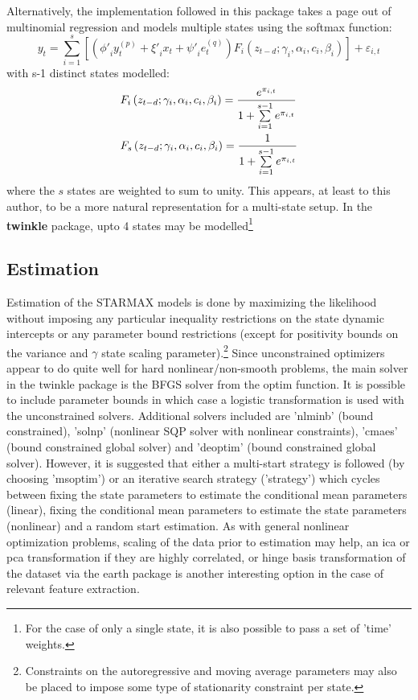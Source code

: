 Alternatively, the implementation followed in this package takes a page out of
multinomial regression and models multiple states using the softmax function:
\begin{equation}\label{eq:mrstar_new}
{y_t} = \sum\limits_{i = 1}^s {\left[ {\left( {{{\phi '}_i}y_t^{\left( p
\right)} + {{\xi '}_i}{x_t} + {{\psi '}_i}e_t^{\left( q \right)}}
\right){F_i}\left( {{z_{t-d}};{ \gamma_i},{ \alpha _i},{c_i},{\beta_i}}
\right)} \right]}  + {\varepsilon_{i,t}}
\end{equation}
with s-1 distinct states modelled:
\begin{equation}
\begin{gathered}
  {F_i}\left( {{z_{t-d}};{ \gamma_i},{ \alpha _i},{ c_i},{\beta_i}} \right) =
  \frac{{{e^{{\pi _{i,t}}}}}} {{1 + \sum\limits_{i = 1}^{s - 1} {{e^{{\pi _{i,t}}}}} }} \hfill \\
  {F_s}\left( {{z_{t-d}};{ \gamma_i},{ \alpha _i},{ c_i},{\beta_i}} \right) =
  \frac{1} {{1 + \sum\limits_{i = 1}^{s - 1} {{e^{{\pi _{i,t}}}}} }} \hfill \\
\end{gathered}
\end{equation}
where the $s$ states are weighted to sum to unity. This appears, at least to
this author, to be a more natural representation for a multi-state setup. In the
\textbf{twinkle} package, upto 4 states may be modelled\footnote{For the case of
only a single state, it is also possible to pass a set of 'time' weights.}

\subsection{Estimation}
Estimation of the STARMAX models is done by maximizing the likelihood without
imposing any particular inequality restrictions on the state dynamic intercepts
or any parameter bound restrictions (except for positivity bounds on the
variance and $\gamma$ state scaling parameter).\footnote{Constraints on the
autoregressive and moving average parameters may also be placed to impose some
type of stationarity constraint per state.} Since unconstrained optimizers
appear to do quite well for hard nonlinear/non-smooth problems, the main solver
in the twinkle package is the BFGS solver from the optim function. It is
possible to include parameter bounds in which case a logistic transformation is
used with the unconstrained solvers.
Additional solvers included are 'nlminb' (bound constrained), 'solnp'
(nonlinear SQP solver with nonlinear constraints), 'cmaes' (bound constrained
global solver) and 'deoptim' (bound constrained global solver).
However, it is suggested that either a multi-start strategy is followed
(by choosing 'msoptim') or an iterative search strategy ('strategy') which
cycles between fixing the state parameters to estimate the conditional mean 
parameters (linear), fixing the conditional mean parameters to estimate the
state parameters (nonlinear) and a random start estimation. As with general
nonlinear optimization problems, scaling of the data prior to estimation
may help, an ica or pca transformation if they are highly correlated, or hinge
basis transformation of the dataset via the earth package is another interesting
option in the case of relevant feature extraction.
